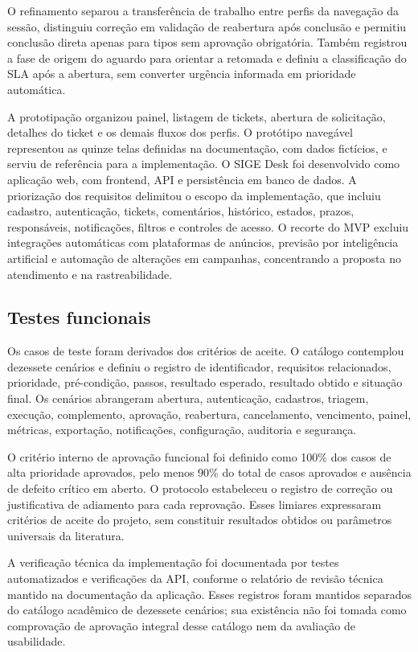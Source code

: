 O refinamento separou a transferência de trabalho entre perfis da navegação da sessão, distinguiu correção em validação de reabertura após conclusão e permitiu conclusão direta apenas para tipos sem aprovação obrigatória. Também registrou a fase de origem do aguardo para orientar a retomada e definiu a classificação do SLA após a abertura, sem converter urgência informada em prioridade automática.

A prototipação organizou painel, listagem de tickets, abertura de solicitação, detalhes do ticket e os demais fluxos dos perfis. O protótipo navegável representou as quinze telas definidas na documentação, com dados fictícios, e serviu de referência para a implementação. O SIGE Desk foi desenvolvido como aplicação web, com frontend, API e persistência em banco de dados. A priorização dos requisitos delimitou o escopo da implementação, que incluiu cadastro, autenticação, tickets, comentários, histórico, estados, prazos, responsáveis, notificações, filtros e controles de acesso. O recorte do MVP excluiu integrações automáticas com plataformas de anúncios, previsão por inteligência artificial e automação de alterações em campanhas, concentrando a proposta no atendimento e na rastreabilidade.

\subsection{\esp Testes funcionais}

Os casos de teste foram derivados dos critérios de aceite. O catálogo contemplou dezessete cenários e definiu o registro de identificador, requisitos relacionados, prioridade, pré-condição, passos, resultado esperado, resultado obtido e situação final. Os cenários abrangeram abertura, autenticação, cadastros, triagem, execução, complemento, aprovação, reabertura, cancelamento, vencimento, painel, métricas, exportação, notificações, configuração, auditoria e segurança.

O critério interno de aprovação funcional foi definido como 100\% dos casos de alta prioridade aprovados, pelo menos 90\% do total de casos aprovados e ausência de defeito crítico em aberto. O protocolo estabeleceu o registro de correção ou justificativa de adiamento para cada reprovação. Esses limiares expressaram critérios de aceite do projeto, sem constituir resultados obtidos ou parâmetros universais da literatura.

A verificação técnica da implementação foi documentada por testes automatizados e verificações da API, conforme o relatório de revisão técnica mantido na documentação da aplicação. Esses registros foram mantidos separados do catálogo acadêmico de dezessete cenários; sua existência não foi tomada como comprovação de aprovação integral desse catálogo nem da avaliação de usabilidade.

